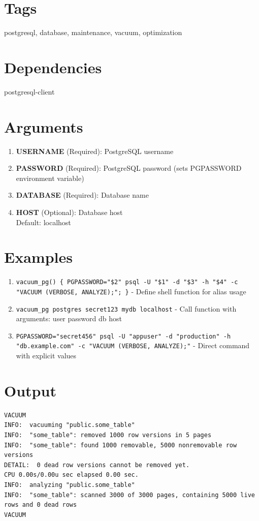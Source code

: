 \documentclass[openany]{book}
\begin{document}
\section*{Tags}
postgresql, database, maintenance, vacuum, optimization

\section*{Dependencies}
postgresql-client


\section*{Arguments}
\begin{enumerate}
  \item \textbf{USERNAME} (Required): PostgreSQL username
  \item \textbf{PASSWORD} (Required): PostgreSQL password (sets PGPASSWORD environment variable)
  \item \textbf{DATABASE} (Required): Database name
  \item \textbf{HOST} (Optional): Database host \\ Default: localhost
\end{enumerate}

\section*{Examples}
\begin{enumerate}
  \item \texttt{vacuum\_pg() \{ PGPASSWORD="\$2" psql -U "\$1" -d "\$3" -h "\$4" -c "VACUUM (VERBOSE, ANALYZE);"; \}} - Define shell function for alias usage
  \item \texttt{vacuum\_pg postgres secret123 mydb localhost} - Call function with arguments: user password db host
  \item \texttt{PGPASSWORD="secret456" psql -U "appuser" -d "production" -h "db.example.com" -c "VACUUM (VERBOSE, ANALYZE);"} - Direct command with explicit values
\end{enumerate}

\section*{Output}
\begin{lstlisting}
VACUUM
INFO:  vacuuming "public.some_table"
INFO:  "some_table": removed 1000 row versions in 5 pages
INFO:  "some_table": found 1000 removable, 5000 nonremovable row versions
DETAIL:  0 dead row versions cannot be removed yet.
CPU 0.00s/0.00u sec elapsed 0.00 sec.
INFO:  analyzing "public.some_table"
INFO:  "some_table": scanned 3000 of 3000 pages, containing 5000 live rows and 0 dead rows
VACUUM
\end{lstlisting}
\end{document}
